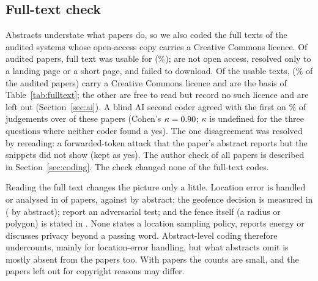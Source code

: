 \documentclass[12pt]{article}
\begin{document}
\subsection{Full-text check}\label{sec:fulltext}
Abstracts understate what papers do, so we also coded the full texts of the audited systems whose open-access copy carries a Creative Commons licence. Of \ftTried{} audited papers, full text was usable for \ftAllN{} (\ftPct\%); \ftNoOA{} are not open access, \ftShort{} resolved only to a landing page or a short page, and \ftErr{} failed to download. Of the \ftAllN{} usable texts, \ftN{} (\ftCcPct\% of the audited papers) carry a Creative Commons licence and are the basis of Table~\ref{tab:fulltext}; the other \ftLicNone{} are free to read but record no such licence and are left out (Section~\ref{sec:ai}). A blind AI second coder agreed with the first on \agPct\% of \agJ{} judgements over \agN{} of these papers (Cohen's $\kappa=0.90$; $\kappa$ is undefined for the three questions where neither coder found a yes). The one disagreement was resolved by rereading: a forwarded-token attack that the paper's abstract reports but the snippets did not show (kept as yes).\humanSentence{} The author check of all \ftN{} papers is described in Section~\ref{sec:coding}. The check changed none of the \ftCodes{} full-text codes.

Reading the full text changes the picture only a little. Location error is handled or analysed in \ftQone{} of \ftN{} papers, against \ftAbsQone{} by abstract; the geofence decision is measured in \ftQtwo{} (\ftAbsQtwo{} by abstract); \ftQthree{} report an adversarial test; and the fence itself (a radius or polygon) is stated in \ftQseven{}. None states a location sampling policy, reports energy or discusses privacy beyond a passing word. Abstract-level coding therefore undercounts, mainly for location-error handling, but what abstracts omit is mostly absent from the papers too. With \ftN{} papers the counts are small, and the \ftLicNone{} papers left out for copyright reasons may differ.



\end{document}
